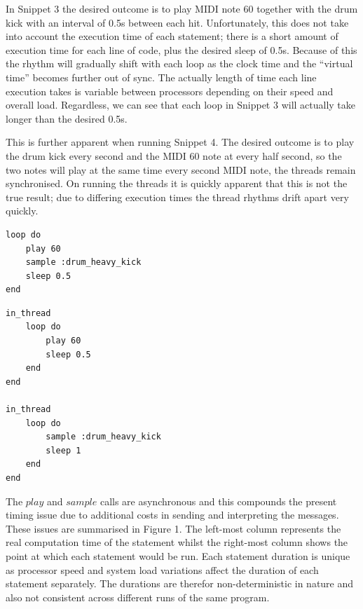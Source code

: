 \documentclass[11pt, abstracton, twoside, titlepage=true]{scrartcl}
\begin{document}
\begin{multicols}{2}
In Snippet 3 the desired outcome is to play MIDI note 60 together with the 
drum kick with an interval of 0.5s between each hit. Unfortunately, this does 
not take into account the execution time of each statement; there is a short 
amount of execution time for each line of code, plus the desired sleep of 0.5s.
Because of this the rhythm will gradually shift with each loop as the 
clock time and the ``virtual time'' becomes further out of sync. The 
actually length of time each line execution takes is variable between 
processors depending on their speed and overall load. Regardless, we can see 
that each loop in Snippet 3 will actually take longer than the desired 0.5s.

This is further apparent when running Snippet 4. The desired outcome is to 
play the drum kick every second and the MIDI 60 note at every half second, so 
the two notes will play at the same time every second MIDI note, the threads 
remain synchronised. On running the threads it is quickly apparent that this 
is not the true result; due to differing execution times the thread rhythms 
drift apart very quickly.

	\begin{minipage}{0.5\textwidth}

		\begin{minipage}{\textwidth}
			\begin{lstlisting}[style = sonicpi]
loop do
    play 60
    sample :drum_heavy_kick
    sleep 0.5
end
			\end{lstlisting}
		\end{minipage}

		\begin{minipage}{\textwidth}
			\begin{lstlisting}[style = sonicpi]
in_thread
    loop do
        play 60
        sleep 0.5
    end
end

in_thread
    loop do
        sample :drum_heavy_kick
        sleep 1
    end
end
			\end{lstlisting}
		\end{minipage}

	\end{minipage}

\end{multicols}

The $play$ and $sample$ calls are asynchronous and this compounds the present 
timing issue due to additional costs in sending and interpreting the messages. 
These issues are summarised in Figure 1. The left-most column represents the 
real computation time of the statement whilst the right-most column shows the 
point at which each statement would be run. Each statement duration is unique 
as processor speed and system load variations affect the duration of each 
statement separately. The durations are therefor non-deterministic in nature 
and also not consistent across different runs of the same program.
\end{document}
